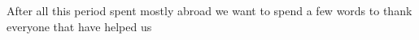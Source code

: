 After all this period spent mostly abroad we want to spend a few words to thank everyone that have helped us 





